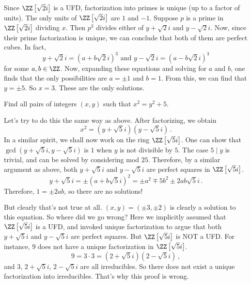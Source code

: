 \documentclass[11pt]{scrartcl}
\begin{document}
Since \(\ZZ \left[\sqrt 2 i\right] \) is a UFD, factorization into primes is unique (up to a factor of units). The only units of \(\ZZ \left[\sqrt 2 i\right] \) are \(1\) and \(-1\). Suppose \(p\) is a prime in \(\ZZ \left[\sqrt 2 i\right] \) dividing \(x\). Then \(p^3\) divides either of \(y+\sqrt 2i\) and \(y-\sqrt 2i\). Now, since their prime factorization is unique, we can conclude that both of them are perfect cubes. In fact,
\[ y+\sqrt 2i = \left(a+b\sqrt 2i\right)^3 \text{ and } y - \sqrt 2i = \left(a - b\sqrt 2i\right)^3  \]
for some \(a,b \in \ZZ\). Now, expanding these equations and solving for \(a\) and \(b\), one finds that the only possibilities are \(a = \pm 1\) and \(b=1\). From this, we can find that \(y = \pm 5\). So \(x = 3\). These are the only solutions.

\vspace{5mm}

\begin{exercise}
Find all pairs of integers \(\left(x,y\right) \) such that \(x^2 = y^2 + 5\).
\end{exercise}
Let's try to do this the same way as above. After factorizing, we obtain
\[ x^2 = \left(y + \sqrt 5i\right) \left(y - \sqrt 5i\right) \,. \]
In a similar spirit, we shall now work on the ring \(\ZZ \left[  \sqrt 5i\right] \). One can show that \(\gcd \left( y + \sqrt 5i , y - \sqrt 5i \right) \) is \(1\) when \(y\) is not divisible by \(5\). The case \(5 \mid y\) is trivial, and can be solved by considering mod \(25\). Therefore, by a similar argument as above, both \(y + \sqrt 5i\) and \( y - \sqrt 5i\) are perfect squares in \(\ZZ \left[  \sqrt 5i\right] \).
\[ y + \sqrt 5i = \pm \left(a + b \sqrt 5i\right)^2 =  \pm a^2 \mp 5b^2 \pm 2ab \sqrt 5i \,.  \]
Therefore, \(1 = \pm 2ab\), so there are no solutions!

But clearly that's not true at all. \(\left(x,y\right) = \left(\pm 3, \pm 2\right) \) is clearly a solution to this equation. So where did we go wrong? Here we implicitly assumed that \(\ZZ \left[  \sqrt 5i\right] \) is a UFD, and invoked unique factorization to argue that both \(y + \sqrt 5i\) and \( y - \sqrt 5i\) are perfect squares. But \(\ZZ \left[  \sqrt 5i\right] \) is NOT a UFD.
For instance, \(9\) does not have a unique factorization in \(\ZZ \left[  \sqrt 5i\right] \).
\[ 9 = 3 \cdot 3 = \left(2 + \sqrt 5i\right) \left(2- \sqrt 5i\right) \, , \]
and \(3\), \(2 + \sqrt 5i\), \(2 - \sqrt 5i\) are all irreducibles. So there does not exist a unique factorization into irreducibles. That's why this proof is wrong.
\end{document}
